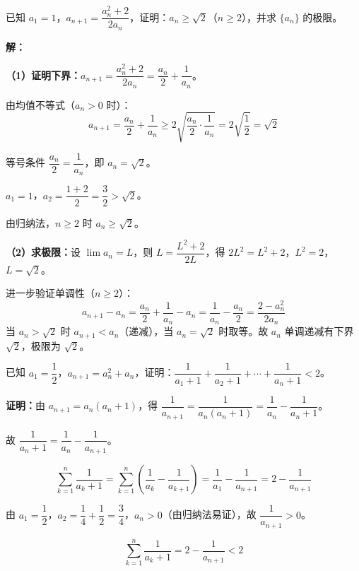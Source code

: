 \documentclass[12pt, a4paper]{ctexart}
\begin{document}
\begin{examplebox}[【例题9】构造辅助数列证明不等式]
已知 $a_1 = 1$，$a_{n+1} = \dfrac{a_n^2 + 2}{2a_n}$，证明：$a_n \geq \sqrt{2}$（$n\geq 2$），并求 $\{a_n\}$ 的极限。
\end{examplebox}

\textbf{解：}

\textbf{（1）证明下界：}$a_{n+1} = \dfrac{a_n^2 + 2}{2a_n} = \dfrac{a_n}{2} + \dfrac{1}{a_n}$。

由均值不等式（$a_n > 0$ 时）：
\[
a_{n+1} = \frac{a_n}{2} + \frac{1}{a_n} \geq 2\sqrt{\frac{a_n}{2}\cdot\frac{1}{a_n}} = 2\sqrt{\frac{1}{2}} = \sqrt{2}
\]

等号条件 $\dfrac{a_n}{2} = \dfrac{1}{a_n}$，即 $a_n = \sqrt{2}$。

$a_1 = 1$，$a_2 = \dfrac{1+2}{2} = \dfrac{3}{2} > \sqrt{2}$。

由归纳法，$n\geq 2$ 时 $a_n \geq \sqrt{2}$。\;\checkmark

\textbf{（2）求极限：}设 $\lim a_n = L$，则 $L = \dfrac{L^2+2}{2L}$，得 $2L^2 = L^2 + 2$，$L^2 = 2$，$L = \sqrt{2}$。

进一步验证单调性（$n\geq 2$）：
\[
a_{n+1} - a_n = \frac{a_n}{2} + \frac{1}{a_n} - a_n = \frac{1}{a_n} - \frac{a_n}{2} = \frac{2 - a_n^2}{2a_n}
\]
当 $a_n > \sqrt{2}$ 时 $a_{n+1} < a_n$（递减），当 $a_n = \sqrt{2}$ 时取等。故 $a_n$ 单调递减有下界 $\sqrt{2}$，极限为 $\sqrt{2}$。

\begin{examplebox}[【例题10】递推与不等式综合]
已知 $a_1 = \dfrac{1}{2}$，$a_{n+1} = a_n^2 + a_n$，证明：$\dfrac{1}{a_1 + 1} + \dfrac{1}{a_2 + 1} + \cdots + \dfrac{1}{a_n + 1} < 2$。
\end{examplebox}

\textbf{证明：}由 $a_{n+1} = a_n(a_n + 1)$，得 $\dfrac{1}{a_{n+1}} = \dfrac{1}{a_n(a_n+1)} = \dfrac{1}{a_n} - \dfrac{1}{a_n+1}$。

故 $\dfrac{1}{a_n + 1} = \dfrac{1}{a_n} - \dfrac{1}{a_{n+1}}$。

\[
\sum_{k=1}^{n}\frac{1}{a_k+1} = \sum_{k=1}^{n}\left(\frac{1}{a_k} - \frac{1}{a_{k+1}}\right) = \frac{1}{a_1} - \frac{1}{a_{n+1}} = 2 - \frac{1}{a_{n+1}}
\]

由 $a_1 = \dfrac{1}{2}$，$a_2 = \dfrac{1}{4} + \dfrac{1}{2} = \dfrac{3}{4}$，$a_n > 0$（由归纳法易证），故 $\dfrac{1}{a_{n+1}} > 0$。

\[
\sum_{k=1}^{n}\frac{1}{a_k+1} = 2 - \frac{1}{a_{n+1}} < 2
\]
\end{document}
